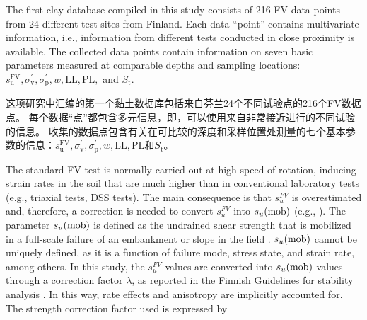 \begin{ParaColumn}

    \switchcolumn*
    
    The first clay database compiled in this study consists of 216 FV data points from 24 different test sites from Finland. Each data “point” contains multivariate information, i.e., information from different tests conducted in close proximity is available. The collected data points contain information on seven basic parameters measured at comparable depths and sampling locations: $s_{\mathrm{u}}^{\mathrm{FV}}, \sigma_{\mathrm{v}}^{\prime},\sigma_{\mathrm{p}}^{\prime}, w, \mathrm{LL}, \mathrm{PL},$ and $S_{\mathrm{t}}$.

    \switchcolumn

    这项研究中汇编的第一个黏土数据库包括来自芬兰24个不同试验点的216个FV数据点。 每个数据“点”都包含多元信息，即，可以使用来自非常接近进行的不同试验的信息。 收集的数据点包含有关在可比较的深度和采样位置处测量的七个基本参数的信息：$s_{\mathrm{u}}^{\mathrm{FV}}, \sigma_{\mathrm{v}}^{\prime},\sigma_{\mathrm{p}}^{\prime}, w, \mathrm{LL}, \mathrm{PL}$和$S_{\mathrm{t}}$。

    \switchcolumn*

    The standard FV test is normally carried out at high speed of rotation, inducing strain rates in the soil that are much higher than in conventional laboratory tests (e.g., triaxial tests, DSS tests). The main consequence is that $s_{u}^{F V}$ is overestimated and, therefore, a correction is needed to convert $s_{u}^{F V}$ into $s_u(\rm{mob})$ (e.g., \citet{Bjerrum19721}). The parameter $s_u(\rm{mob})$ is defined as the undrained shear strength that is mobilized in a full-scale failure of an embankment or slope in the field \citep{Bjerrum19721,Mesri20071}. $s_u(\rm{mob})$ cannot be uniquely defined, as it is a function of failure mode, stress state, and strain rate, among others. In this study, the $s_{u}^{F V}$ values are converted into $s_u(\rm{mob})$ values through a correction factor $\lambda$, as reported in the Finnish Guidelines for stability analysis \citep{Ratahallintokeskus2005}. In this way, rate effects and anisotropy are implicitly accounted for. The strength correction factor used is expressed by 


\end{ParaColumn}
